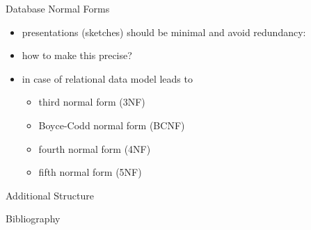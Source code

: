 \documentclass[xcolor=pst,dvips]{beamer}   %
\begin{document}
\begin{frame}{Database Normal Forms}
\begin{itemize}
\item presentations (sketches) should be minimal and avoid redundancy:
\item how to make this precise?
\item in case of relational data model leads to 
   \begin{itemize}
     \item third normal form (3NF)
     \item Boyce-Codd normal form (BCNF)
     \item fourth normal form (4NF)
     \item fifth normal form (5NF)
   \end{itemize}
\end{itemize}
\end{frame}

\begin{frame}{Additional Structure}
\resizebox{11.3cm}{!}{

\featurelist
}
\end{frame}

\begin{frame}{Bibliography}

\end{frame}
\end{document}

